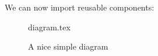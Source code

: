 \documentclass[float=false, crop=false]{standalone}
\begin{document}
We can now import reusable components:
 
\begin{figure}[ht]
    \centering
    {diagram.tex}
    \label{fig:tikzexample}
    \caption{A nice simple diagram}
\end{figure}
 
\end{document}
